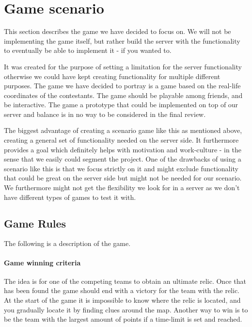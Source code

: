 \section{Game scenario}\label{sec:game}

This section describes the game we have decided to focus on. We will not be implementing the game itself, but rather build the server with the functionality to eventually be able to implement it - if you wanted to. 

It was created for the purpose of setting a limitation for the server functionality otherwise we could have kept creating functionality for multiple different purposes. The game we have decided to portray is a game based on the real-life coordinates of the contestants. The game should be playable among friends, and be interactive. The game a prototype that could be implemented on top of our server and balance is in no way to be considered in the final review.

The biggest advantage of creating a scenario game like this as mentioned above, creating a general set of functionality needed on the server side. It furthermore provides a goal which definitely helps with motivation and work-culture - in the sense that we easily could segment the project. One of the drawbacks of using a scenario like this is that we focus strictly on it and might exclude functionality that could be great on the server side but might not be needed for our scenario. We furthermore might not get the flexibility we look for in a server as we don't have different types of games to test it with.

\subsection{Game Rules}\label{subsec:game-rules}

The following is a description of the game.

\paragraph{Game winning criteria}
The idea is for one of the competing teams to obtain an ultimate relic. Once that has been found the game should end with a victory for the team with the relic. At the start of the game it is impossible to know where the relic is located, and you gradually locate it by finding clues around the map.
Another way to win is to be the team with the largest amount of points if a time-limit is set and reached.

